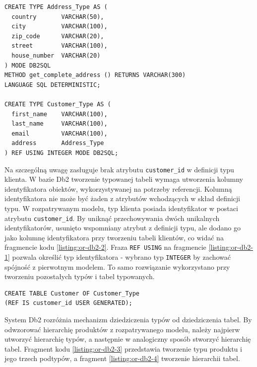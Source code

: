 \documentclass[a4paper,twoside,12pt]{book}
\begin{document}
\begin{lstlisting}[style=SQL, caption={Definicja typów adresu i klienta w Db2.}, label={listing:or-db2-1}, captionpos=b]
CREATE TYPE Address_Type AS (
  country       VARCHAR(50),
  city          VARCHAR(100),
  zip_code      VARCHAR(20),
  street        VARCHAR(100),
  house_number  VARCHAR(20)
) MODE DB2SQL
METHOD get_complete_address () RETURNS VARCHAR(300) 
LANGUAGE SQL DETERMINISTIC;

CREATE TYPE Customer_Type AS (
  first_name    VARCHAR(100),
  last_name     VARCHAR(100),
  email         VARCHAR(100),
  address       Address_Type
) REF USING INTEGER MODE DB2SQL;
\end{lstlisting}

Na szczególną uwagę zasługuje brak atrybutu \lstinline{customer_id} w definicji typu klienta. W bazie Db2 tworzenie typowanej tabeli wymaga utworzenia kolumny identyfikatora obiektów, wykorzystywanej na potrzeby referencji. Kolumną identyfikatora nie może być żaden z atrybutów wchodzących w skład definicji typu. W rozpatrywanym modelu, typ klienta posiada identyfikator w postaci atrybutu \lstinline{customer_id}. By uniknąć przechowywania dwóch unikalnych identyfikatorów, usunięto wspomniany atrybut z definicji typu, ale dodano go jako kolumnę identyfikatora przy tworzeniu tabeli klientów, co widać na fragmencie kodu \ref{listing:or-db2-2}. Fraza \lstinline{REF USING} na fragmencie \ref{listing:or-db2-1} pozwala określić typ identyfikatora - wybrano typ \lstinline{INTEGER} by zachować spójność z pierwotnym modelem. To samo rozwiązanie wykorzystano przy tworzeniu pozostałych typów i tabel typowanych.

\begin{lstlisting}[style=SQL, caption={Tworzenie tabeli klientów w Db2.}, label={listing:or-db2-2}, captionpos=b]
CREATE TABLE Customer OF Customer_Type
(REF IS customer_id USER GENERATED);
\end{lstlisting}

System Db2 rozróżnia mechanizm dziedziczenia typów od dziedziczenia tabel. By odwzorować hierarchię produktów z rozpatrywanego modelu, należy najpierw utworzyć hierarchię typów, a następnie w analogiczny sposób stworzyć hierarchię tabel. Fragment kodu \ref{listing:or-db2-3} przedstawia tworzenie typu produktu i jego trzech podtypów, a fragment \ref{listing:or-db2-4} tworzenie hierarchii tabel.
 
\end{document}
